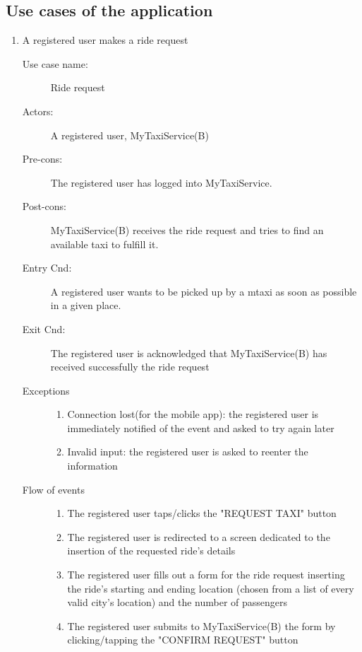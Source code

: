 \documentclass[11pt]{article} %
\begin{document}
    \subsection{Use cases of the application}
	\begin{enumerate}	

	      \item A registered user makes a ride request
		\begin{description}
		        \item [Use case name:] Ride request 
		        \item [Actors:] A registered user, MyTaxiService(B)
		        \item [Pre-cons:] The registered user has logged into MyTaxiService.
		        \item [Post-cons:] MyTaxiService(B) receives the ride request and tries to find an available taxi to fulfill it.
		        \item [Entry Cnd:] A registered user wants to be picked up by a mtaxi as soon as possible in a given place.
		        \item [Exit Cnd:] The registered user is acknowledged that MyTaxiService(B) has received successfully the ride
		        request
		        \item [Exceptions]\hfill
			\begin{enumerate}
			          \item Connection lost(for the mobile app): the registered user is immediately notified of the event and
			          asked to try again later
			          \item Invalid input: the registered user is asked to reenter the information
			\end{enumerate}
		        \item [Flow of events]\hfill
			\begin{enumerate}
			          \item The registered user taps/clicks the "REQUEST TAXI" button
			          \item The registered user is redirected to a screen dedicated to the insertion
			          of the requested ride's details
			          \item The registered user fills out a form for the ride request inserting the ride's starting and ending location
			          (chosen from a list of every valid city's location) and the number of passengers
			          \item The registered user submits to MyTaxiService(B) the form by clicking/tapping the "CONFIRM REQUEST" button
			\end{enumerate}
		\end{description}
	

\end{enumerate}
\end{document}
